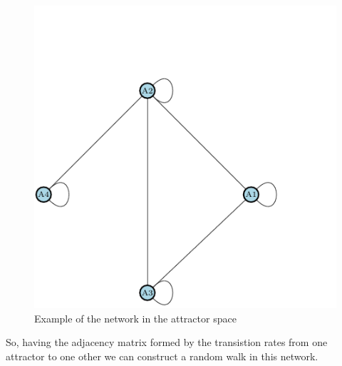 \documentclass[11pt]{article}
\begin{document}
\begin{figure}[h]
\centering
\includegraphics[scale=1]{fg5.pdf}
\caption{Example of the network in the attractor space}
\label{fig:rb5}
\end{figure}

So, having the adjacency matrix formed by the transistion rates from one attractor to one other we can construct a random walk in this network.
\end{document}
